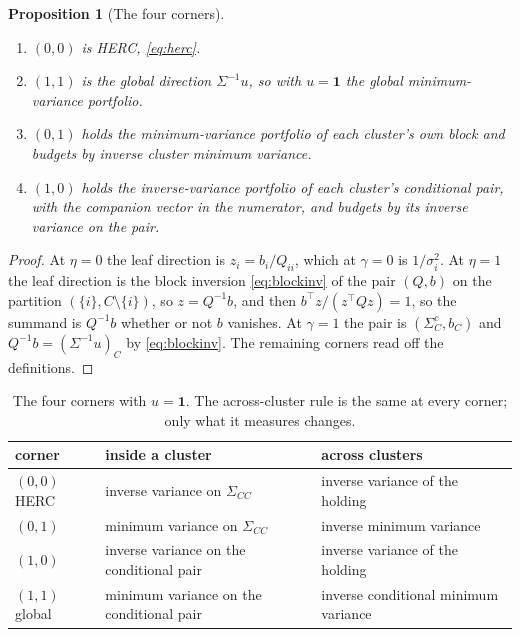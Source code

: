 \documentclass[11pt]{article}
\newcommand{\ones}{\mathbf{1}}
\newtheorem{proposition}{Proposition}
\begin{document}
\begin{proposition}[The four corners]
\label{prop:corners}
\leavevmode
\begin{enumerate}
\item $(0,0)$ is HERC, \eqref{eq:herc}.
\item $(1,1)$ is the global direction $\Sigma^{-1}u$, so with $u=\ones$
  the global minimum-variance portfolio.
\item $(0,1)$ holds the minimum-variance portfolio of each cluster's own
  block and budgets by inverse cluster minimum variance.
\item $(1,0)$ holds the inverse-variance portfolio of each cluster's
  conditional pair, with the companion vector in the numerator, and budgets
  by its inverse variance on the pair.
\end{enumerate}
\end{proposition}

\begin{proof}
At $\eta=0$ the leaf direction is $z_i=b_i/Q_{ii}$, which at $\gamma=0$ is
$1/\sigma_i^2$. At $\eta=1$ the leaf direction is the block inversion
\eqref{eq:blockinv} of the pair $(Q,b)$ on the partition
$(\{i\},C\setminus\{i\})$, so $z=Q^{-1}b$, and then
$b^\top z/(z^\top Qz)=1$, so the summand is $Q^{-1}b$ whether or not $b$
vanishes. At $\gamma=1$ the pair is $(\Sigma^c_C,b_C)$ and
$Q^{-1}b=(\Sigma^{-1}u)_C$ by \eqref{eq:blockinv}. The remaining corners
read off the definitions.
\end{proof}

\begin{table}[ht]
\centering
\begin{tabular}{@{}lll@{}}
\toprule
corner & inside a cluster & across clusters \\
\midrule
$(0,0)$ HERC & inverse variance on $\Sigma_{CC}$ & inverse variance of the holding \\
$(0,1)$ & minimum variance on $\Sigma_{CC}$ & inverse minimum variance \\
$(1,0)$ & inverse variance on the conditional pair & inverse variance of the holding \\
$(1,1)$ global & minimum variance on the conditional pair & inverse conditional minimum variance \\
\bottomrule
\end{tabular}
\caption{The four corners with $u=\ones$. The across-cluster rule is the
same at every corner; only what it measures changes.}
\label{tab:corners}
\end{table}
\end{document}
